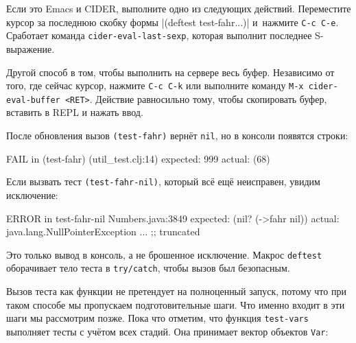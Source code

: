 
Если это Emacs и CIDER, выполните одно из следующих действий. Переместите курсор
за последнюю скобку формы \spverb|(deftest test-fahr...)| и~нажмите
\verb|C-c C-e|. Сработает команда \texttt{cider\--eval-last-sexp}, которая
выполнит последнее S-выражение.

Другой способ в том, чтобы выполнить на сервере весь буфер. Независимо от того,
где сейчас курсор, нажмите \verb|C-c C-k| или выполните команду
\verb|M-x cider-eval-buffer <RET>|. Действие равносильно тому, чтобы скопировать
буфер, вставить в REPL и нажать ввод.

После обновления вызов \verb|(test-fahr)| вернёт \verb|nil|, но в консоли
появятся строки:

\begin{english}
  \begin{clojure}
FAIL in (test-fahr) (util_test.clj:14)
expected: 999
  actual: (68)
  \end{clojure}
\end{english}

Если вызвать тест \verb|(test-fahr-nil)|, который всё ещё неисправен,
увидим исключение:

\pagebreaklarge

\ifnarrow

\begin{english}
  \begin{clojure}
ERROR in test-fahr-nil Numbers.java:3849
expected: (nil? (->fahr nil))
  actual: java.lang.NullPointerException
    ... ;; truncated
  \end{clojure}
\end{english}

\else

\begin{english}
\end{english}

\fi

Это только вывод в консоль, а не брошенное исключение. Макрос \verb|deftest|
оборачивает тело теста в \verb|try/catch|, чтобы вызов был безопасным.

Вызов теста как функции не претендует на полноценный запуск, потому что при
таком способе мы пропускаем подготовительные шаги. Что именно входит в эти шаги
мы рассмотрим позже. Пока что отметим, что функция \verb|test-vars| выполняет
тесты с учётом всех стадий. Она принимает вектор объектов \verb|Var|:

